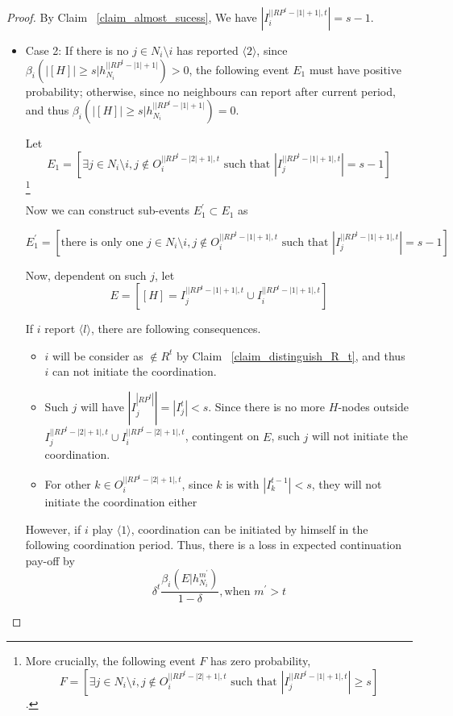 \documentclass[12pt]{article}
\theoremstyle{remark}
\theoremstyle{remark}
\begin{document}
\begin{proof}

By Claim ~\ref{claim_almost_sucess}, We have $|I^{||RP^t-|1|+1|,t}_i|= s-1$.
\begin{itemize}


\item Case 2: If there is no $j\in N_i\setminus i$ has reported $\langle 2 \rangle$, since $\beta_{i}(|[H]|\geq s|h^{||RP^t-|1|+1|}_{N_i})>0$, the following event $E_1$ must have positive probability; otherwise, since no neighbours can report after current period, and thus $\beta_{i}(|[H]|\geq s|h^{||RP^t-|1|+1|}_{N_i})=0$.

Let
\[E_1=[\exists j\in N_i\setminus i, j\notin O^{||RP^t-|2|+1|,t}_i \text{ such that } |I^{||RP^t-|1|+1|,t}_j|= s-1]\]\footnote{More crucially, the following event $F$ has zero probability,
\[F=[\exists j\in N_i\setminus i, j\notin O^{||RP^t-|2|+1|,t}_i \text{ such that } |I^{||RP^t-|1|+1|,t}_j|\geq s]\]. } 



Now we can construct sub-events $E^{'}_1\subset E_1$ as

\[E^{'}_1=[\text{there is only one } j\in N_i\setminus i, j\notin O^{||RP^t-|1|+1|,t}_i \text{ such that } |I^{||RP^t-|1|+1|,t}_j|= s-1]\] 

Now, dependent on such $j$, let
\[E=[[H]=I^{||RP^t-|1|+1|,t}_j\cup I^{||RP^t-|1|+1|,t}_i]\]

If $i$ report $\langle l \rangle$, there are following consequences.

\begin{itemize}
\item $i$ will be consider as $\notin R^t$ by Claim ~\ref{claim_distinguish_R_t}, and thus $i$ can not initiate the coordination.
\item Such $j$ will have $|I^{|RP^t|}_j|=|I^t_j|<s$. Since there is no more $H$-nodes outside $I^{||RP^t-|2|+1|,t}_j\cup I^{||RP^t-|2|+1|,t}_i$, contingent on $E$, such $j$ will not initiate the coordination.
\item For other $k\in O^{||RP^t-|2|+1|,t}_i$, since $k$ is with $|I^{t-1}_k|< s$, they will not initiate the coordination either
\end{itemize}

However, if $i$ play $\langle 1 \rangle$, coordination can be initiated by himself in the following coordination period. Thus, there is a loss in expected continuation pay-off by
\[\delta^{t}\frac{\beta_{i}(E|h^{m^{'}}_{N_i})}{1-\delta}, \text{when } m^{'}> t\]




\end{itemize}




\end{proof}
\end{document}
